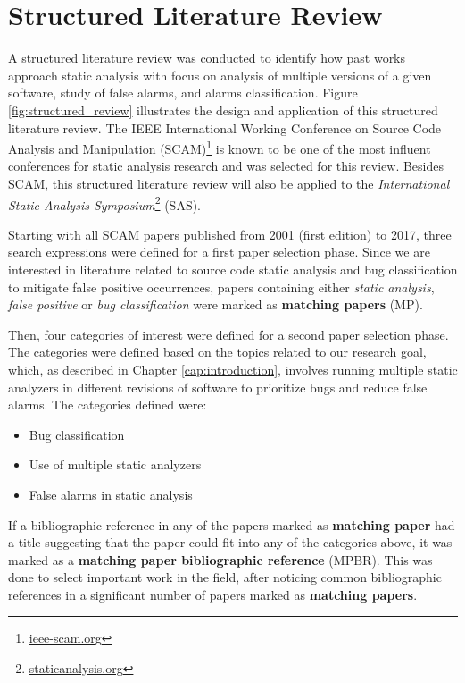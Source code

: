 \chapter{Structured Literature Review}
\label{ch:literature}

A structured literature review was conducted to identify how past works
approach static analysis with focus on analysis of multiple versions of a given
software, study of false alarms, and alarms classification. Figure
\ref{fig:structured_review} illustrates the design and application of this
structured literature review. The IEEE International Working Conference on Source Code
Analysis and Manipulation (SCAM)\footnote{\url{ieee-scam.org}} is known to be
one of the most influent conferences for static analysis research and was
selected for this review.  Besides SCAM, this structured literature review will also be
applied to the \textit{International Static Analysis
Symposium}\footnote{\url{staticanalysis.org}} (SAS).



Starting with all SCAM papers published from 2001 (first edition) to 2017,
three search expressions were defined for a first paper selection phase. Since
we are interested in literature related to source code static analysis and  bug
classification to mitigate false positive occurrences, papers containing either
\textit{static analysis}, \textit{false positive} or \textit{bug
classification} were marked as \textbf{matching papers} (MP).

Then, four categories of interest were defined for a second paper selection phase. The
categories were defined based on the topics related to our research goal, which,
as described in Chapter \ref{cap:introduction}, involves running multiple static
analyzers in different revisions of software to prioritize bugs and reduce false
alarms. The categories defined were:

\begin{itemize}
\item Bug classification
\item Use of multiple static analyzers
\item False alarms in static analysis
\end{itemize}

If a bibliographic reference in any of the papers marked as \textbf{matching
paper} had a title suggesting that the paper could fit into any of the
categories above, it was marked as a \textbf{matching paper bibliographic
reference} (MPBR). This was done to select important work in the field,
after noticing common bibliographic references in a significant number of
papers marked as \textbf{matching papers}.

